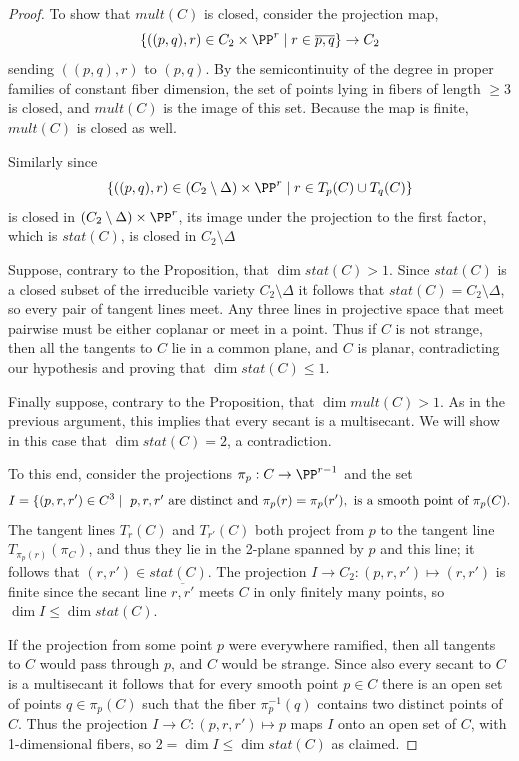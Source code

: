 \begin{proof}
To show that $mult(C)$ is closed, consider the projection map, 
$$
\{((p,q), r) \in C_2\times \PP^r \mid r \in \overline{p,q}\} \to C_2 
$$
sending  $((p,q),r)$ to $(p,q)$. By the semicontinuity of the degree in proper families of constant fiber dimension, the set of points lying in fibers
of length $\geq 3$ is closed, and $mult(C)$ is the image of this set. Because the map is finite, 
$mult(C)$  is closed as well.

Similarly since 
$$
\{((p,q), r) \in (C_2\setminus \Delta)\times \PP^r \mid r \in T_p(C)\cup T_q(C) \}
$$
is closed in $(C_2\setminus \Delta)\times \PP^r$, its image under the projection to the first factor,
which is $stat(C)$, is closed in $C_2\setminus \Delta$

Suppose, contrary to the Proposition, that $\dim stat(C) >1$. Since $stat(C)$ is a closed subset of the irreducible variety $C_2\setminus \Delta$ it
follows that $stat(C) = C_2\setminus \Delta$, so every pair of tangent lines meet. Any three
lines in projective space that meet pairwise must be either coplanar or meet in a point. Thus if $C$ is not strange,
then all the tangents to $C$ lie in a common plane, and $C$ is planar, contradicting our hypothesis
and proving that $\dim stat(C)\leq 1$.

Finally suppose, contrary to the Proposition,  that $\dim mult(C)>1$. As in the previous argument, this
implies that every secant is a multisecant.  We will show in this case that $\dim stat(C) =2$, a contradiction. 

To this end, consider the projections $\pi_{p}: C \to \PP^{r-1}$ and the set  
$$
I = \{(p,r,r') \in C^3 \mid \hbox{ $p,r,r'$ are distinct and } \pi_{p}(r) = \pi_{p}(r'), \hbox{ is a smooth point of $\pi_p(C)$}.
$$
The tangent lines $T_r(C)$ and $T_{r'}(C)$ both project from $p$ to the tangent line $T_{\pi_p(r)}(\pi_C)$,
and thus they lie in the 2-plane spanned by $p$ and this line; it follows that $(r,r') \in stat(C)$.
The projection $I \to C_2: (p,r,r') \mapsto (r,r')$ is finite since the secant line $\overline{r,r'}$ meets $C$ in only finitely many points, 
so $\dim I \leq \dim stat(C)$.

 If the projection from some point $p$ were everywhere ramified,
then all tangents to $C$ would pass through $p$, and $C$ would be strange.
Since also every secant to $C$ is a multisecant it follows that  for every smooth point $p\in C$ there is an open set of points $q\in \pi_p(C)$ such that
the fiber $\pi_p^{-1}(q)$ contains two distinct points of $C$. Thus the projection $I \to C: (p,r,r') \mapsto p$ maps
$I$ onto an open set of $C$, with 1-dimensional fibers, so $2 = \dim I\leq \dim stat(C)$ as claimed. \end{proof}


